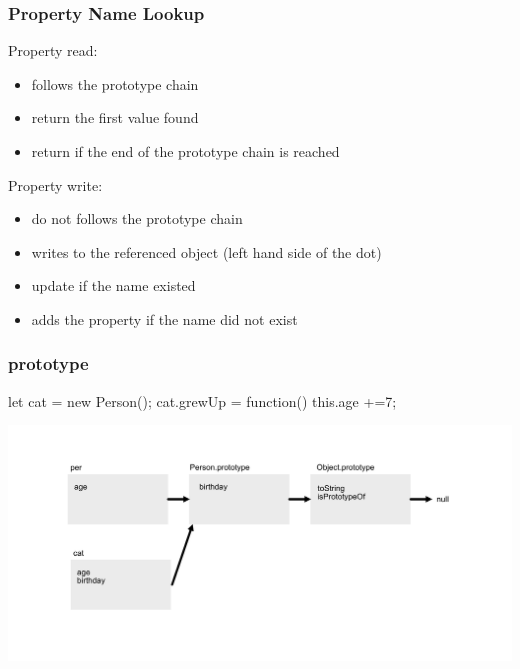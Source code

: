 \begin{frame}[fragile] \frametitle{Property Name Lookup}
Property read:
\begin{itemize}
  \item follows the prototype chain
  \item return the first value found
  \item return  if the end of the prototype chain is reached
\end{itemize}
\vspace{8mm}
Property write:
\begin{itemize}
  \item do not follows the prototype chain
  \item writes to the referenced object (left hand side of the dot)
  \item update if the name existed
  \item adds the property if the name did not exist
\end{itemize}
\end{frame}

\begin{frame}[fragile] \frametitle{prototype}
\begin{CodeBox}{}
let cat = new Person();
cat.grewUp = function() { this.age +=7; }
\end{CodeBox}
  \centering
  \includegraphics[width=14cm]{img/prototype_chain4}
\end{frame}

